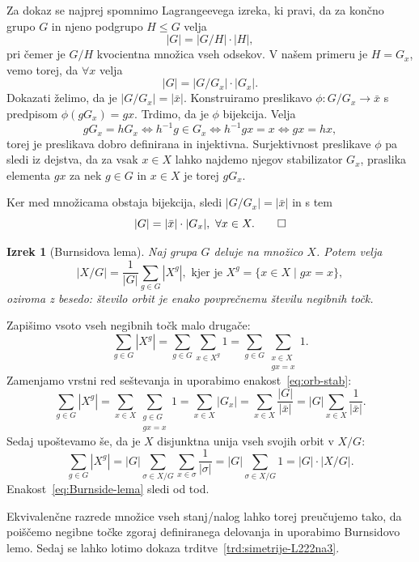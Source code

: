 \documentclass[12pt,a4paper]{amsart}
\theoremstyle{definition} %
\theoremstyle{plain} %
\newtheorem{izrek}[definicija]{Izrek}
\begin{document}
\proof
    Za dokaz se najprej spomnimo Lagrangeevega izreka, ki pravi, da za končno grupo $G$ in njeno podgrupo $H \leq G$ velja
    \[ |G| = |G/H| \cdot |H|, \]
    pri čemer je $G/H$ kvocientna množica vseh odsekov.
    V našem primeru je $H = G_x$, vemo torej, da $\forall x$ velja
    \[ |G| = |G/G_x| \cdot |G_x|. \]
    Dokazati želimo, da je $|G/G_x| = |\bar{x}|.$ Konstruiramo preslikavo $\phi \colon G/G_x \rightarrow \bar{x}$ s predpisom $\phi(gG_x) = gx$. Trdimo, da je $\phi$ bijekcija. Velja
    \[ gG_x=hG_x \iff h^{-1}g \in G_x \iff h^{-1}gx=x \iff gx=hx, \]
    torej je preslikava dobro definirana in injektivna. Surjektivnost preslikave $\phi$ pa sledi iz dejstva, da za vsak $x \in X$ lahko najdemo njegov stabilizator $G_x$, praslika elementa $gx$ za nek $g \in G$ in $x \in X$ je torej $gG_x$. 
    
    Ker med množicama obstaja bijekcija, sledi $|G/G_x| = |\bar{x}|$ in s tem
    \[ |G| = |\bar{x}| \cdot |G_x|,\ \forall x \in X. \qedhere \]
\endproof

\begin{izrek}[Burnsidova lema]
    Naj grupa $G$ deluje na množico $X$. Potem velja
    \begin{equation}
        |X/G| = \frac{1}{|G|} \sum_{g \in G} |X^g|,\text{ kjer je } X^g=\{ x \in X \mid gx = x \},
        \label{eq:Burnside-lema}
    \end{equation}
    oziroma z besedo: število orbit je enako povprečnemu številu negibnih točk.
\end{izrek}

\proof
    Zapišimo vsoto vseh negibnih točk malo drugače:
    \[
        \sum_{g \in G} |X^g| = \sum_{g \in G} \sum_{x \in X^g} 1 = \sum_{g \in G} \sum_{\substack{x \in X \\ gx = x}} 1.  
    \]
    Zamenjamo vrstni red seštevanja in uporabimo enakost~\eqref{eq:orb-stab}:
    \[
        \sum_{g \in G} |X^g| = \sum_{x \in X} \sum_{\substack{g \in G \\ gx = x}} 1 = 
        \sum_{x \in X} |G_x| = \sum_{x \in X} \frac{|G|}{|\bar{x}|} = |G| \sum_{x \in X} \frac{1}{|\bar{x}|}.
    \]
    Sedaj upoštevamo še, da je $X$ disjunktna unija vseh svojih orbit v $X/G$:
    \[
        \sum_{g \in G} |X^g| = |G| \sum_{\sigma \in X/G} \sum_{x \in \sigma} \frac{1}{|\sigma|} = |G| \sum_{\sigma \in X/G} 1 = |G| \cdot |X/G|.
    \]
    Enakost~\eqref{eq:Burnside-lema} sledi od tod.
\endproof

Ekvivalenčne razrede množice vseh stanj/nalog lahko torej preučujemo tako, da poiščemo negibne točke zgoraj definiranega delovanja in uporabimo Burnsidovo lemo. Sedaj se lahko lotimo dokaza trditve~\ref{trd:simetrije-L222na3}.
\end{document}
